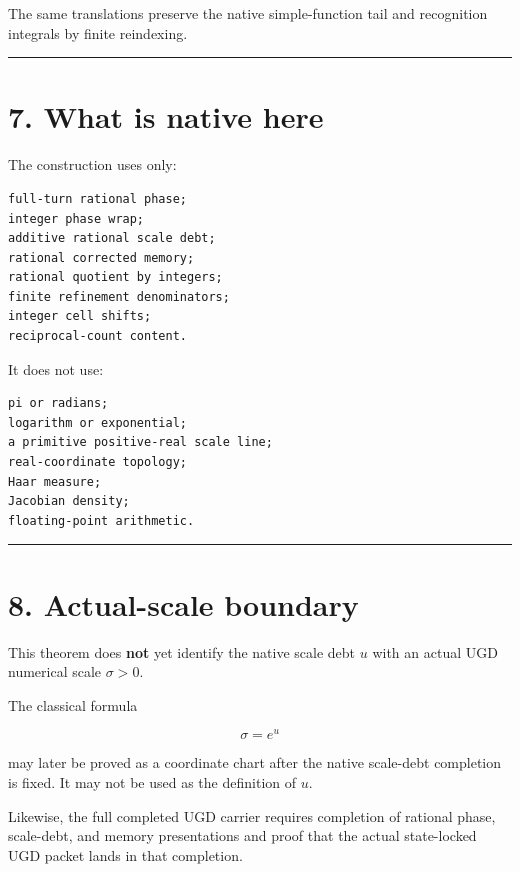 The same translations preserve the native simple-function tail and recognition
integrals by finite reindexing.

\begin{center}\rule{0.5\linewidth}{0.5pt}\end{center}

\hypertarget{what-is-native-here}{%
\section{7. What is native here}\label{what-is-native-here}}

The construction uses only:

\begin{verbatim}
full-turn rational phase;
integer phase wrap;
additive rational scale debt;
rational corrected memory;
rational quotient by integers;
finite refinement denominators;
integer cell shifts;
reciprocal-count content.
\end{verbatim}

It does not use:

\begin{verbatim}
pi or radians;
logarithm or exponential;
a primitive positive-real scale line;
real-coordinate topology;
Haar measure;
Jacobian density;
floating-point arithmetic.
\end{verbatim}

\begin{center}\rule{0.5\linewidth}{0.5pt}\end{center}

\hypertarget{actual-scale-boundary}{%
\section{8. Actual-scale boundary}\label{actual-scale-boundary}}

This theorem does \textbf{not} yet identify the native scale debt \(u\) with an
actual UGD numerical scale \(\sigma>0\).

The classical formula

\[
\sigma=e^u
\]

may later be proved as a coordinate chart after the native scale-debt completion
is fixed. It may not be used as the definition of \(u\).

Likewise, the full completed UGD carrier requires completion of rational phase,
scale-debt, and memory presentations and proof that the actual state-locked UGD
packet lands in that completion.

